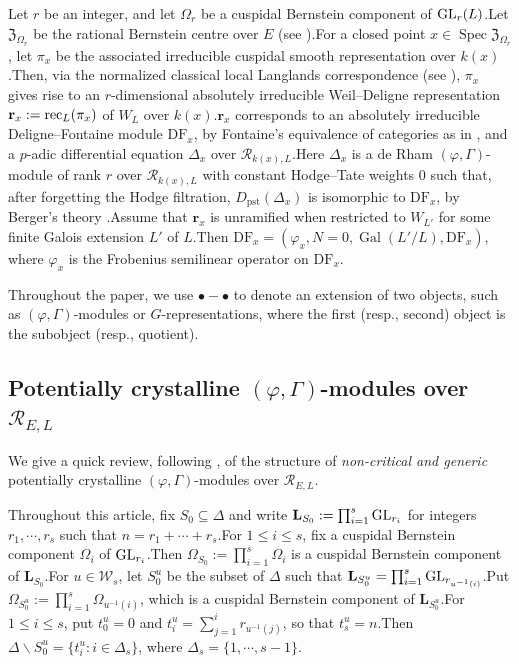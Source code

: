 \documentclass[10pt]{article}
\DeclareMathOperator{\Gal}{Gal}
\DeclareMathOperator{\Spec}{Spec}
\newcommand{\GLN}{{\rm GL}}
\newcommand{\df}{{\mathrm{DF}}}
\newcommand{\wdre}{{\textbf{r}}}
\newcommand{\rec}{{\rm rec}_L}
\newcommand{\bL}{{\mathbf{L}}}
\newcommand{\cR}{\mathcal R}
\newcommand{\FZ}{{\mathfrak{Z}}}
\newcommand{\sW}{\mathscr W}
\begin{document}
Let $r$ be an integer, and let $\Omega_r$ be a cuspidal Bernstein component of $\GLN_r(L)$.\;Let $\FZ_{\Omega_{r}}$ be the rational Bernstein centre over $E$ (see \cite[Section 3.2]{PATCHING2016}).\;For a closed point $x\in \Spec\FZ_{\Omega_{r}}$, let $\pi_x$ be the associated irreducible cuspidal smooth representation over $k(x)$.\;Then, via the normalized classical local Langlands correspondence (see \cite{scholze2013local}), $\pi_x$ gives rise to an $r$-dimensional absolutely irreducible Weil--Deligne representation $\wdre_x:=\rec(\pi_x)$ of $W_L$ over $k(x)$.\;$\wdre_x$ corresponds to an absolutely irreducible Deligne--Fontaine module $\df_x$, by Fontaine's equivalence of categories as in \cite[Proposition 4.1]{breuil2007first}, and a $p$-adic differential equation ${\Delta_x}$ over $\cR_{k(x),L}$.\;Here ${\Delta_x}$ is a de Rham $(\varphi,\Gamma)$-module of rank $r$ over $\cR_{k(x),L}$ with constant Hodge--Tate weights $0$ such that, after forgetting the Hodge filtration, $D_{\mathrm{pst}}(\Delta_x)$ is isomorphic to $\df_x$, by Berger's theory \cite[Theorem A]{berger2008equations}.\;Assume that $\wdre_x$ is unramified when restricted to $W_{L'}$ for some finite Galois extension $L'$ of $L$.\;Then $\df_x=(\varphi_x,N=0,\Gal(L'/L),\df_x)$, where
$\varphi_x$ is the Frobenius semilinear operator on $\df_x$.\;

Throughout the paper, we use $\bullet-\bullet$ to denote an extension of two objects, such as $(\varphi,\Gamma)$-modules or $G$-representations, where the first (resp., second) object is the subobject (resp., quotient).\;
 






\subsection{\texorpdfstring{Potentially crystalline $(\varphi,\Gamma)$-modules over $\cR_{E,L}$}{Potentially crystalline (phi,Gamma)-modules over R E,L}}\label{Omegafil}


We give a quick review, following \cite[Section 2.3]{Ding2021}, of the structure of \textit{non-critical and generic} potentially crystalline $(\varphi,\Gamma)$-modules over $\cR_{E,L}$.\;


Throughout this article, fix $S_0\subseteq\Delta$ and write $\bL_{S_0}:=\prod_{i=1}^s\GLN_{r_i}$ for integers $r_1,\cdots,r_s$ such that $n=r_1+\cdots+r_s$.\;For $1\leq i\leq s$, fix a cuspidal Bernstein component $\Omega_{i}$ of $\GLN_{r_i}$.\;Then $\Omega_{S_0}:=\prod_{i=1}^s\Omega_{i}$ is a cuspidal Bernstein component of $\bL_{S_0}$.\;For $u\in \sW_s$, let $S_0^u$ be the subset of $\Delta$ such that $\bL_{S_0^u}=\prod_{i=1}^s\GLN_{r_{u^{-1}(i)}}$.\;Put $\Omega_{S^u_0}:=\prod_{i=1}^s\Omega_{u^{-1}(i)}$, which is a cuspidal Bernstein component of $\bL_{S^u_0}$.\;For $1\leq i\leq s$, put $t_0^u=0$ and $t_i^u=\sum_{j=1}^ir_{u^{-1}(j)}$, so that $t^u_s=n$.\;Then $\Delta\backslash S_0^u=\{t_i^u:i\in \Delta_s\}$, where $\Delta_s=\{1,\cdots,s-1\}$.\;
\end{document}
